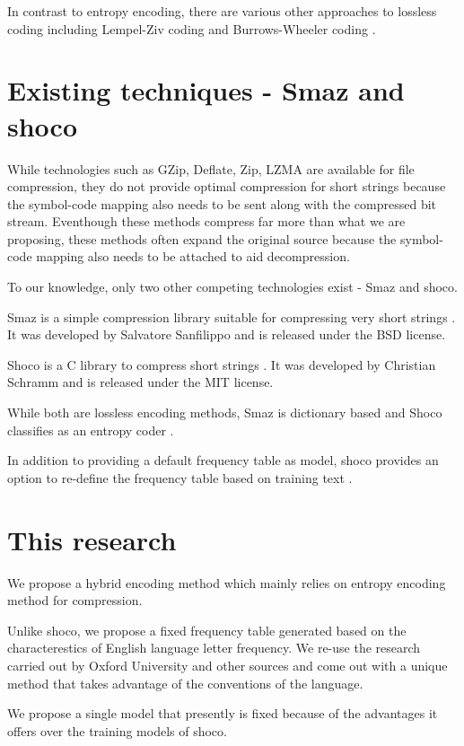 \documentclass[]{article}
\begin{document}
In contrast to entropy encoding, there are various other approaches to lossless coding including Lempel-Ziv coding \cite{4} and Burrows-Wheeler coding \cite{5}.

\section{Existing techniques - Smaz and shoco}

While technologies such as GZip, Deflate, Zip, LZMA are available for file compression, they do not provide optimal compression for short strings because the symbol-code mapping also needs to be sent along with the compressed bit stream.  Eventhough these methods compress far more than what we are proposing, these methods often expand the original source because the symbol-code mapping also needs to be attached to aid decompression.

To our knowledge, only two other competing technologies exist - Smaz and shoco.

Smaz is a simple compression library suitable for compressing very short strings \cite{9}. It was developed by Salvatore Sanfilippo and is released under the BSD license.

Shoco is a C library to compress short strings \cite{10}. It was developed by Christian Schramm and is released under the MIT license.

While both are lossless encoding methods, Smaz is dictionary based and Shoco classifies as an entropy coder \cite{10}.

In addition to providing a default frequency table as model, shoco provides an option to re-define the frequency table based on training text \cite{10}.

\section{This research}

We propose a hybrid encoding method which mainly relies on entropy encoding method for compression.

Unlike shoco, we propose a fixed frequency table generated based on the characterestics of English language letter frequency.  We re-use the research carried out by Oxford University \cite{7} and other sources \cite{6} \cite{8} and come out with a unique method that takes advantage of the conventions of the language.

We propose a single model that presently is fixed because of the advantages it offers over the training models of shoco.
\end{document}
